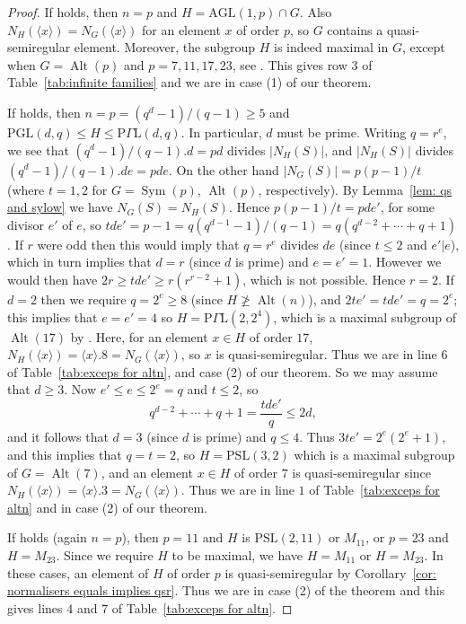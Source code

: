 \documentclass{article}
\theoremstyle{remark}
\theoremstyle{definition}
\DeclareMathOperator{\Alt}{Alt}
\DeclareMathOperator{\Sym}{Sym}
\newcommand{\AGL}{\mathrm{AGL}}
\newcommand{\PGL}{\mathrm{PGL}}
\newcommand{\PSL}{\mathrm{PSL}}
\newcommand{\qsr}{quasi-semiregular}
\newcommand{\qsre}{quasi-semiregular element}
\begin{document}
\begin{proof}
If \cite[Theorem 1.2(1)(a)]{Jones} holds, then $n=p$ and $H= \AGL(1,p) \cap G$.   Also $N_H(\langle x \rangle)=N_G(\langle x \rangle)$ for an element $x$ of order $p$, so $G$ contains a {\qsre}.  Moreover, the subgroup $H$ is indeed maximal in $G$, except when  $G = \Alt(p)$ and $p=7,11,17,23$, see \cite[Theorem(I)]{LPSAltSymMax}. This gives row $3$ of Table~\ref{tab:infinite families} and we are in case (1) of our theorem.

If \cite[Theorem 1.2(1)(b)]{Jones} holds, then  $n=p=(q^d-1)/(q-1)\geqslant5$ and $\PGL(d,q) \leqslant H \leqslant \mathrm{P}\Gamma\mathrm{L}(d,q)$. In particular, $d$ must be prime. Writing $q=r^e$, we see that
  $(q^d-1)/(q-1).d=pd$ divides $|N_H(S)|$, and $|N_H(S)|$ divides 
$(q^d-1)/(q-1).de=pde.$
On the other hand $|N_G(S)| = p(p-1)/t$ (where $t=1,2$ for $G=\Sym(p)$,  $\Alt(p)$, respectively). By  Lemma~\ref{lem: qs and sylow} we have $N_G(S) = N_H(S)$. 
Hence $p(p-1)/t = pde'$, for some divisor $e'$ of $e$, so $tde'=p-1 = q(q^{d-1}-1)/(q-1)= q(q^{d-2}+\cdots+q+1)$. If $r$ were odd then this would imply that $q=r^e$ divides $de$ (since $t\leqslant2$ and $e'\vert e$), which in turn implies that $d=r$ (since $d$ is prime) and $e=e'=1$. However we would then have $2r\geqslant tde'\geqslant r(r^{r-2}+1)$, which is not possible. Hence $r=2$.  
If $d=2$ then we require $q=2^e\geqslant8$ (since $H\not\geqslant \Alt(n)$), and $2te'=tde'=q=2^e$; this implies that $e=e'=4$ so  $H=\mathrm{P}{\Gamma}\mathrm{L}(2,2^4)$, which is a maximal subgroup of  
$\Alt(17)$ by  \cite[Theorem(II)]{LPSAltSymMax}.   Here, for an element $x\in H$ of order $17$, $N_H(\langle x \rangle)= \langle x \rangle.8= N_G(\langle x \rangle)$, so $x$ is {\qsr}. Thus we are in line 6 of Table~\ref{tab:exceps for altn}, and case (2) of our theorem.
So we may assume that $d\geqslant3$.
%
 Now $e'\leqslant e\leqslant 2^e=q$ and $t\leqslant 2$, so  
\[ 
q^{d-2}+\cdots + q+1 = \frac{tde'}{q} \leqslant 2d,
\]
and it follows that $d= 3$ (since $d$ is prime) and $q\leqslant 4$. Thus $3te'=2^e(2^e+1)$, and this implies that $q=t=2$, so $H=\PSL(3,2)$ which is a maximal subgroup of $G=\Alt(7)$,   and an element $x\in H$ of order $7$ is {\qsr} since $N_H(\langle x \rangle)= \langle x \rangle.3= N_G(\langle x \rangle)$. Thus we are in line $1$ of Table~\ref{tab:exceps for altn} and in case (2) of our theorem.

 

If \cite[Theorem 1.2(1)(c)]{Jones} holds (again $n=p$), then $p=11$ and $H$ is $\PSL(2,11)$ or  $M_{11}$, or $p=23$ and  $H=M_{23}$. Since we require $H$ to be maximal, we have $H=M_{11}$ or $H=M_{23}$. In these cases, an element of $H$ of order $p$ is {\qsr} by Corollary~\ref{cor: normalisers equals implies qsr}. Thus we are in case (2) of the theorem and this gives lines $4$ and $7$ of Table~\ref{tab:exceps for altn}.


\end{proof}
\end{document}
